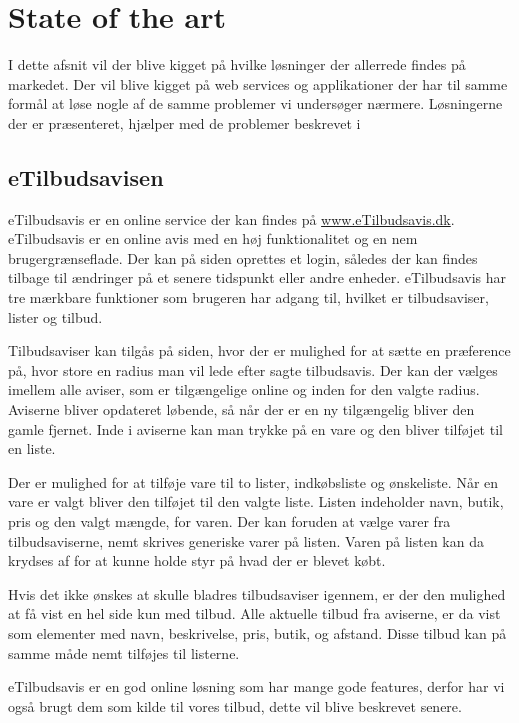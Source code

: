 \chapter{State of the art}
I dette afsnit vil der blive kigget på hvilke løsninger der allerrede findes på markedet.
Der vil blive kigget på web services og applikationer der har til samme formål at løse nogle af de samme problemer vi undersøger nærmere.
Løsningerne der er præsenteret, hjælper med de problemer beskrevet i 

\section{eTilbudsavisen}
eTilbudsavis er en online service der kan findes på \underline{www.eTilbudsavis.dk}. eTilbudsavis er en online avis med en høj funktionalitet og en nem brugergrænseflade.
Der kan på siden oprettes et login, således der kan findes tilbage til ændringer på et senere tidspunkt eller andre enheder.
eTilbudsavis har tre mærkbare funktioner som brugeren har adgang til, hvilket er tilbudsaviser, lister og tilbud.

Tilbudsaviser kan tilgås på siden, hvor der er mulighed for at sætte en præference på, hvor store en radius man vil lede efter sagte tilbudsavis. 
Der kan der vælges imellem alle aviser, som er tilgængelige online og inden for den valgte radius. 
Aviserne bliver opdateret løbende, så når der er en ny tilgængelig bliver den gamle fjernet. 
Inde i aviserne kan man trykke på en vare og den bliver tilføjet til en liste.

Der er mulighed for at tilføje vare til to lister, indkøbsliste og ønskeliste. 
Når en vare er valgt bliver den tilføjet til den valgte liste.
Listen indeholder navn, butik, pris og den valgt mængde, for varen. 
Der kan foruden at vælge varer fra tilbudsaviserne, nemt skrives generiske varer på listen. Varen på listen kan da krydses af for at kunne holde styr på hvad der er blevet købt.

Hvis det ikke ønskes at skulle bladres tilbudsaviser igennem, er der den mulighed at få vist en hel side kun med tilbud. 
Alle aktuelle tilbud fra aviserne, er da vist som elementer med navn, beskrivelse, pris, butik, og afstand. Disse tilbud kan på samme måde nemt tilføjes til listerne.

eTilbudsavis er en god online løsning som har mange gode features, derfor har vi også brugt dem som kilde til vores tilbud, dette vil blive beskrevet senere.

